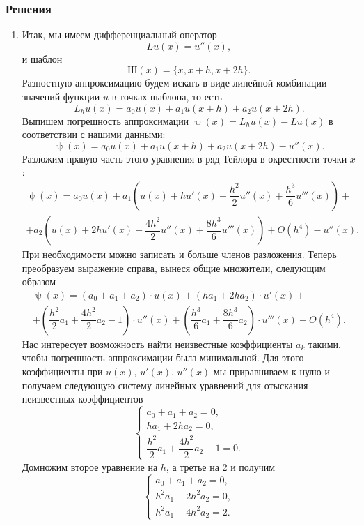 \documentclass[a4paper, 12pt]{article}
\renewcommand{\psi}{\uppsi}
\begin{document}
	\subsubsection*{Решения}
	\begin{enumerate}
		\item \hypertarget{t1}{}
		Итак, мы имеем дифференциальный оператор $$Lu(x) = u''(x),$$ и шаблон $$\text{Ш}(x) = \{x, x+h, x+2h\}.$$ Разностную аппроксимацию будем искать в виде линейной комбинации значений функции $u$ в точках шаблона, то есть $$L_h u(x) = a_0 u(x) + a_1 u(x+h) + a_2 u(x+2h).$$ Выпишем погрешность аппроксимации $\psi(x) = L_h u(x) - L u(x)$ в соответствии с нашими данными: $$\psi(x) = a_0 u(x) + a_1 u(x+h) + a_2 u(x+2h) - u''(x).$$
		Разложим правую часть этого уравнения в ряд Тейлора в окрестности точки $x$:
		\begin{multline*}
			\psi(x) = a_0 u(x) + a_1 \left(u(x) + h u'(x) + \dfrac{h^2}{2}u''(x) + \dfrac{h^3}{6}u'''(x)\right) +\\+ a_2 \left(u(x) + 2h u'(x) + \dfrac{4h^2}{2}u''(x) + \dfrac{8h^3}{6}u'''(x)\right) + O(h^4) - u''(x) .
		\end{multline*}
		При необходимости можно записать и больше членов разложения. Теперь преобразуем выражение справа, вынеся общие множители, следующим образом
		\begin{multline*}
			\psi(x) = (a_0 + a_1 + a_2)\cdot u(x) + (ha_1 + 2ha_2)\cdot  u'(x) +\\+ \left(\dfrac{h^2}{2}a_1 + \dfrac{4h^2}{2}a_2 - 1\right)\cdot u''(x) + \left(\dfrac{h^3}{6}a_1 +\dfrac{8h^3}{6}a_2\right)\cdot u'''(x) +O(h^4).
		\end{multline*}
		Нас интересует возможность найти неизвестные коэффициенты $a_k$ такими, чтобы погрешность аппроксимации была минимальной. Для этого коэффициенты при $u(x)$, $u'(x)$, $u''(x)$ мы приравниваем к нулю и получаем следующую систему линейных уравнений для отыскания неизвестных коэффициентов 
		$$\begin{cases}
			a_0 + a_1 + a_2 = 0,\\
			ha_1  + 2ha_2  = 0,\\
			\dfrac{h^2}{2}a_1 + \dfrac{4h^2}{2}a_2 - 1 = 0.
		\end{cases}$$
		Домножим второе уравнение на $h$, а третье на 2 и получим
		$$\begin{cases}
			a_0 + a_1 + a_2 = 0,\\
			h^2 a_1+ 2 h^2 a_2= 0,\\
			h^2 a_1 + 4h^2a_2 = 2.
		\end{cases}$$

\end{enumerate}
\end{document}
